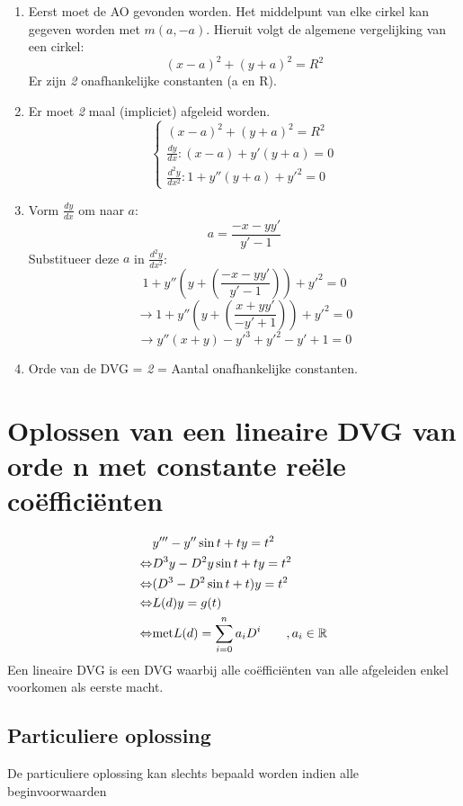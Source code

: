 {
\begin{enumerate}
\item Eerst moet de AO gevonden worden. Het middelpunt van elke cirkel kan gegeven worden met $m(a, -a).$
    Hieruit volgt de algemene vergelijking van een cirkel: $$(x - a)^2 + (y + a)^2 = R^2$$
    Er zijn \textit{2} onafhankelijke constanten (a en R).
\item Er moet \textit{2} maal (impliciet) afgeleid worden.
\[
    \begin{cases}
    (x - a)^2 + (y + a)^2 = R^2 \\
    \frac{dy}{dx} : (x-a) + y'(y+a) = 0 \\
    \frac{d^2y}{dx^2} : 1 + y''(y + a) + y'^2 = 0
    \end{cases}
\]
\item
    Vorm $\frac{dy}{dx}$ om naar $a$:
    $$a = \frac{-x - yy'}{y' - 1}$$
    Substitueer deze $a$ in $\frac{d^2y}{dx^2}$:
    $$1 + y''(y + (\frac{-x - yy'}{y' - 1})) + y'^2 = 0$$
    $$\rightarrow 1 + y''(y + (\frac{x + yy'}{-y' + 1})) + y'^2 = 0$$
    $$\rightarrow y''(x + y) - y'^3 + y'^2 - y' + 1 = 0$$
\item Orde van de DVG = \textit{2}  = Aantal onafhankelijke constanten.
\end{enumerate}
}
\section{Oplossen van een lineaire DVG van orde n met constante reële coëfficiënten}
\begin{equation*}
 \begin{split}
      & y''' - y''\sin t + ty = t^2 \\
  \Leftrightarrow & D^3y - D^2y\sin t + ty = t^2 \\
  \Leftrightarrow & (D^3 - D^2\sin t + t)y = t^2 \\
  \Leftrightarrow & L(d)y = g(t) \\
  \Leftrightarrow & \hbox{met} L(d) = \sum_{i = 0}^{n} a_iD^i \qquad ,a_i \in \mathbb{R}
 \end{split}
\end{equation*}
Een lineaire DVG is een DVG waarbij alle coëfficiënten van alle afgeleiden enkel voorkomen als eerste macht.
\subsection{Particuliere oplossing}
De particuliere oplossing kan slechts bepaald worden indien alle beginvoorwaarden 

